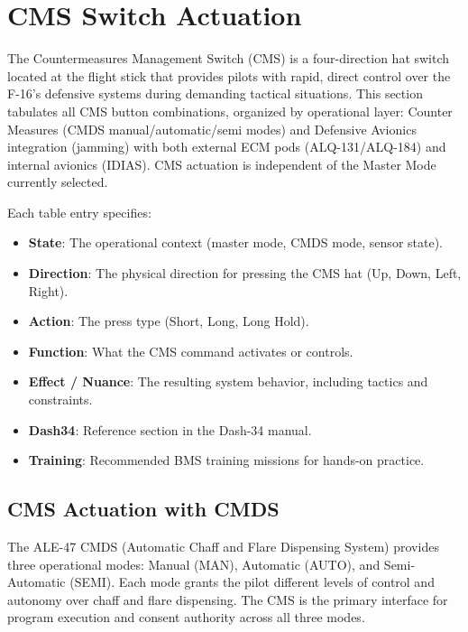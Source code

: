 \documentclass[11pt, a4paper, twoside]{report}
\begin{document}
\section{CMS Switch Actuation}
\label{sec:C5-S2}

The Countermeasures Management Switch (CMS) is a four-direction hat switch located at the flight stick that provides pilots with rapid, direct control over the F-16's defensive systems during demanding tactical situations. This section tabulates all CMS button combinations, organized by operational layer: Counter Measures (CMDS manual/automatic/semi modes) and Defensive Avionics integration (jamming) with both external ECM pods (ALQ-131/ALQ-184) and internal avionics (IDIAS). CMS actuation is independent of the Master Mode currently selected.

Each table entry specifies:

\begin{itemize}
  \item \textbf{State}: The operational context (master mode, CMDS mode, sensor state).
  \item \textbf{Direction}: The physical direction for pressing the CMS hat (Up, Down, Left, Right).
  \item \textbf{Action}: The press type (Short, Long, Long Hold).
  \item \textbf{Function}: What the CMS command activates or controls.
  \item \textbf{Effect / Nuance}: The resulting system behavior, including tactics and constraints.
  \item \textbf{Dash34}: Reference section in the Dash-34 manual.
  \item \textbf{Training}: Recommended BMS training missions for hands-on practice.
\end{itemize}

\subsection{CMS Actuation with CMDS}
\label{sec:C5-S2-S1}

The ALE-47 CMDS (Automatic Chaff and Flare Dispensing System) provides three operational modes: Manual (MAN), Automatic (AUTO), and Semi-Automatic (SEMI). Each mode grants the pilot different levels of control and autonomy over chaff and flare dispensing. The CMS is the primary interface for program execution and consent authority across all three modes.
\end{document}
